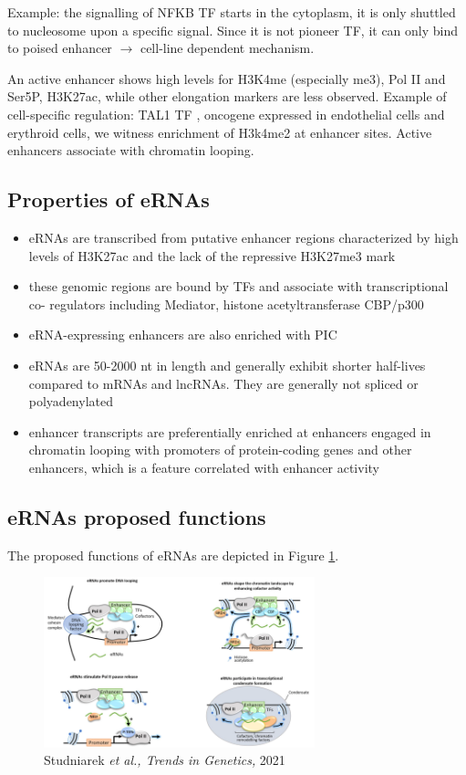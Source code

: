 Example: the signalling of NFKB TF starts in the cytoplasm, it is only shuttled to nucleosome upon a specific signal. Since it is not pioneer TF, it can only bind to poised enhancer $\rightarrow$ cell-line dependent mechanism.

An active enhancer shows high levels for H3K4me (especially me3), Pol II and Ser5P, H3K27ac, while other elongation markers are less observed. Example of cell-specific regulation: TAL1 TF , oncogene expressed in endothelial cells and erythroid cells, we witness enrichment of H3k4me2 at enhancer sites. Active enhancers associate with chromatin looping.

\hypertarget{properties-of-ernas}{%
\subsection{Properties of eRNAs}\label{properties-of-ernas}}

\begin{itemize}
\tightlist
\item
  eRNAs are transcribed from putative enhancer regions characterized by high levels of H3K27ac and the lack of the repressive H3K27me3 mark
\item
  these genomic regions are bound by TFs and associate with transcriptional co- regulators including Mediator, histone acetyltransferase CBP/p300
\item
  eRNA-expressing enhancers are also enriched with PIC
\item
  eRNAs are 50-2000 nt in length and generally exhibit shorter half-lives compared to
  mRNAs and lncRNAs. They are generally not spliced or polyadenylated
\item
  enhancer transcripts are preferentially enriched at enhancers engaged in chromatin looping with promoters of protein-coding genes and other enhancers, which is a feature correlated with enhancer activity
\end{itemize}

\hypertarget{ernas-proposed-functions}{%
\subsection{eRNAs proposed functions}\label{ernas-proposed-functions}}

The proposed functions of eRNAs are depicted in Figure \ref{fig:functions}.
\begin{figure}
\centering
\includegraphics[width=0.7\textwidth]{../_resources/Screenshot_2022-10-12_at_10-00-02.png}
\caption{Studniarek \emph{et al., Trends in Genetics,} 2021}
\label{fig:functions}
\end{figure}

